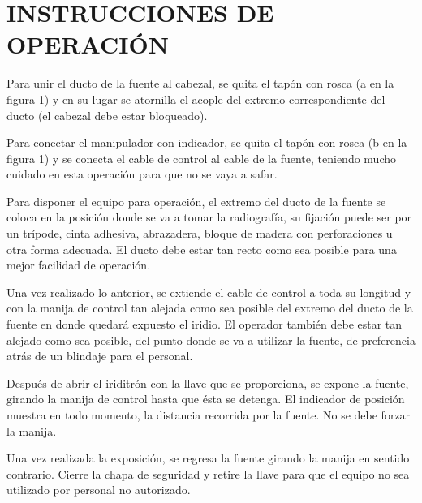 
\section*{INSTRUCCIONES DE OPERACIÓN}

Para unir el ducto de la fuente al cabezal, se quita el tapón con rosca (a en la figura 1) y en su lugar se atornilla el acople del extremo correspondiente del ducto (el cabezal debe estar bloqueado).

Para conectar el manipulador con indicador, se quita el tapón con rosca (b en la figura 1) y se conecta el cable de control al cable de la fuente, teniendo mucho cuidado en esta operación para que no se vaya a safar.

Para disponer el equipo para operación, el extremo del ducto de la fuente se coloca en la posición donde se va a tomar la radiografía, su fijación puede ser por un trípode, cinta adhesiva, abrazadera, bloque de madera con perforaciones u otra forma adecuada. El ducto debe estar tan recto como sea posible para una mejor facilidad de operación.

Una vez realizado lo anterior, se extiende el cable de control a toda su longitud y con la manija de control tan alejada como sea posible del extremo del ducto de la fuente en donde quedará expuesto el iridio. El operador también debe estar tan alejado como sea posible, del punto donde se va a utilizar la fuente, de preferencia atrás de un blindaje para el personal.

Después de abrir el iriditrón con la llave que se proporciona, se expone la fuente, girando la manija de control hasta que ésta se detenga. El indicador de posición muestra en todo momento, la distancia recorrida por la fuente. No se debe forzar la manija.

Una vez realizada la exposición, se regresa la fuente girando la manija en sentido contrario. Cierre la chapa de seguridad y retire la llave para que el equipo no sea utilizado por personal no autorizado.
